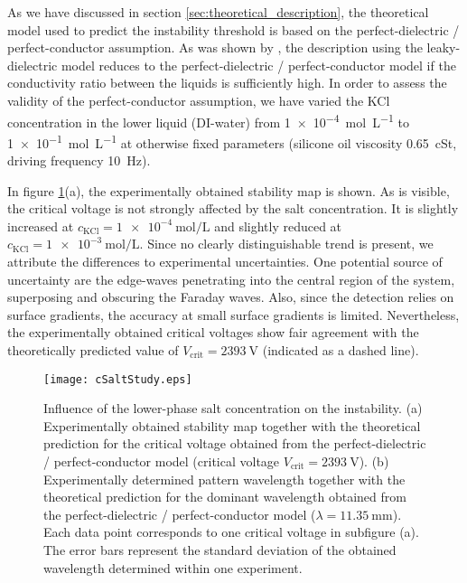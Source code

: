 \documentclass{jfm_arxiv}
\begin{document}
As we have discussed in section \ref{sec:theoretical_description}, the theoretical model used to predict the instability threshold is based on the perfect-dielectric / perfect-conductor assumption. As was shown by \citet{Ward2019}, the description using the leaky-dielectric model reduces to the perfect-dielectric / perfect-conductor model if the conductivity ratio between the liquids is sufficiently high. In order to assess the validity of the perfect-conductor assumption, we have varied the KCl concentration in the lower liquid (DI-water) from \SI{1e-4}{\mol\per\liter} to \SI{1e-1}{\mol\per\liter} at otherwise fixed parameters (silicone oil viscosity \SI{0.65}{\centi St}, driving frequency \SI{10}{\hertz}).

In figure \ref{fig:Results_cSaltStudy}(a), the experimentally obtained stability map is shown. As is visible, the critical voltage is not strongly affected by the salt concentration.
It is slightly increased at $c_\text{KCl}=\SI{1e-4}{\mol\per\liter}$ and slightly reduced at $c_\text{KCl}=\SI{1e-3}{\mol\per\liter}$. Since no clearly distinguishable trend is present, we attribute the differences to experimental uncertainties.
One potential source of uncertainty are the edge-waves penetrating into the central region of the system, superposing and obscuring the Faraday waves. Also, since the detection relies on surface gradients, the accuracy at small surface gradients is limited. Nevertheless, the experimentally obtained critical voltages show fair agreement with the theoretically predicted value of $V_\text{crit}=\SI{2393}{\volt}$ (indicated as a dashed line).
\begin{figure}
  \centerline{\texttt{[image: cSaltStudy.eps]}}%
  \caption{Influence of the lower-phase salt concentration on the instability.
  (a) Experimentally obtained stability map together with the theoretical prediction for the critical voltage obtained from the perfect-dielectric / perfect-conductor model (critical voltage $V_\text{crit}=\SI{2393}{\volt}$).
  (b) Experimentally determined pattern wavelength together with the theoretical prediction for the dominant wavelength obtained from the perfect-dielectric / perfect-conductor model ($\lambda=\SI{11.35}{\milli\meter}$). Each data point corresponds to one critical voltage in subfigure (a). The error bars represent the standard deviation of the obtained wavelength determined within one experiment.}
\label{fig:Results_cSaltStudy}
\end{figure}
\end{document}
